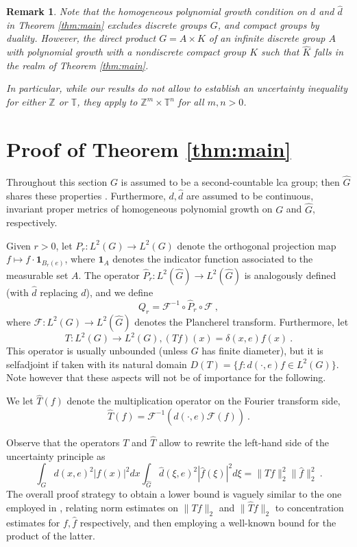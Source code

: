 \documentclass[12pt, reqno]{amsart}
\newtheorem{remark}[theorem]{Remark}
\begin{document}
\begin{remark}
    Note that the homogeneous polynomial growth condition on $d$ and $\widehat{d}$ in Theorem \ref{thm:main} excludes discrete groups $G$, and compact groups by duality. However, the direct product $G = A \times K$ of an infinite discrete group $A$ with polynomial growth with a nondiscrete compact group $K$ such that $\widehat{K}$ falls in the realm of Theorem \ref{thm:main}.

    In particular, while our results do not allow to establish an uncertainty inequality for either $\mathbb{Z}$ or $\mathbb{T}$, they apply to $\mathbb{Z}^m \times \mathbb{T}^n$ for all $m,n>0$.
\end{remark}

\section{Proof of Theorem \ref{thm:main}}

Throughout this section $G$ is assumed to be a second-countable lca group; then $\widehat{G}$ shares these properties \cite{MR1038803}.
Furthermore,  $d,\widehat{d}$ are assumed to be continuous, invariant proper metrics of homogeneous polynomial growth on $G$ and $\widehat{G}$, respectively. 

Given $r>0$, let $P_r : L^2(G) \to L^2(G)$ denote the orthogonal projection map $f \mapsto f \cdot \mathbf{1}_{B_r(e)}$, where $\mathbf{1}_A$ denotes the indicator function associated to the measurable set $A$. The operator $\widehat{P}_r: L^2(\widehat{G}) \to L^2(\widehat{G})$ is analogously defined (with $\widehat{d}$ replacing $d$), and we define 
\[
Q_r = \mathcal{F}^{-1} \circ \widehat{P}_r \circ \mathcal{F}~,
\]
where $\mathcal{F} : L^2(G) \to L^2(\widehat{G})$ denotes the Plancherel transform. 
Furthermore, let 
\[
T: L^2(G) \to L^2(G), (Tf)(x) = \delta(x,e) f(x) ~. 
\] This operator is usually unbounded (unless $G$ has finite diameter), but it is  selfadjoint if taken with its natural domain $D(T) = \{ f : d(\cdot,e) f \in L^2(G) \}$. Note however that these aspects will not be of importance for the following. 

We let $\widehat{T}(f)$ denote the multiplication operator on the Fourier transform side, 
\[
\widehat{T} (f) = \mathcal{F}^{-1}(\widehat{d}(\cdot,e) \mathcal{F}(f))~.
\]

Observe that the operators $T$ and $\widehat{T}$ allow to rewrite the left-hand side of the uncertainty principle as 
\[
\int_G d(x,e)^2 |f(x)|^2 dx \int_{\widehat{G}} \widehat{d}(\xi,e)^2 |\widehat{f}(\xi)|^2 d\xi = \| T f\|_2^2 \|\widehat{f} \|_2^2~. 
\]
The overall proof strategy to obtain a lower bound is vaguely similar to the one employed in \cite{MR3336090}, relating norm estimates on $\| Tf \|_2 $ and $\| \widehat{T} f\|_2$ to concentration estimates for $f, \widehat{f}$ respectively, and then employing a well-known bound for the product of the latter. 
\end{document}
